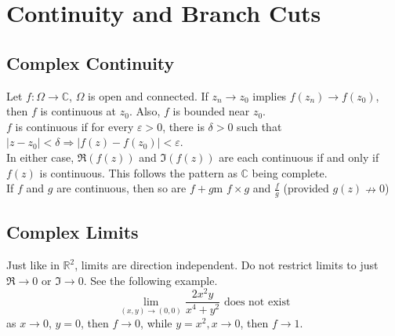 \documentclass[11pt]{article}
\begin{document}
\newpage
\section{Continuity and Branch Cuts}
\subsection{Complex Continuity} 
Let $f:\Omega \to \mathbb{C}$, $\Omega$ is open and connected. If $z_n \to z_0$ implies $f(z_n) \to f(z_0)$, then $f$ is continuous at $z_0$. Also, $f$ is bounded near $z_0$. \\
$f$ is continuous if for every $\varepsilon > 0$, there is $\delta > 0$ such that $|z - z_0| < \delta \Rightarrow |f(z) - f(z_0)| < \varepsilon$. \\
\newline 
In either case, $\Re(f(z))$ and $\Im(f(z))$ are each continuous if and only if $f(z)$ is continuous. This follows the pattern as $\mathbb{C}$ being complete. \\
\newline
If $f$ and $g$ are continuous, then so are $f + g$m $f \times g$ and $\frac{f}{g}$ (provided $g(z) \nrightarrow 0$)

\subsection{Complex Limits}
Just like in $\mathbb{R}^2$, limits are direction independent. Do not restrict limits to just $\Re \to 0$ or $\Im \to 0$. See the following example. \\
\begin{equation*}
\lim_{(x, y) \to (0, 0)} \frac{2x^2y}{x^4 + y^2} \mbox{ does not exist}
\end{equation*} 
as $x \to 0$, $y = 0$, then $f \to 0$, while $y = x^2, x \to 0$, then $f \to 1$.
\end{document}

